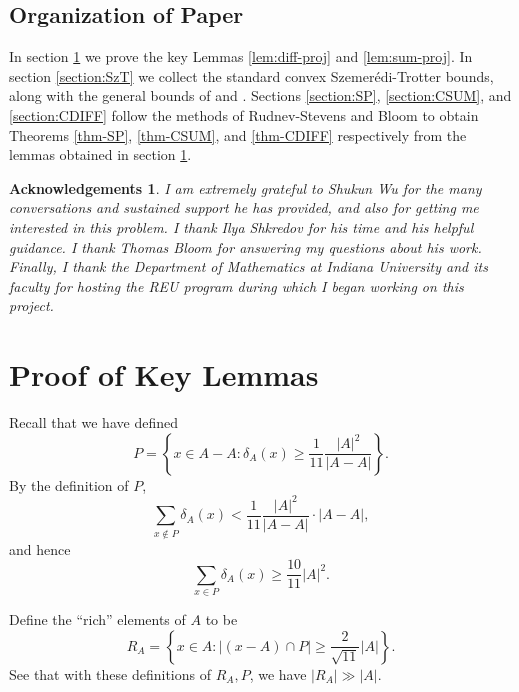 \documentclass[reqno]{amsart}
\newcommand{\szemeredi}{Szemer{\'e}di}
\numberwithin{equation}{section}
\newtheorem*{acknowledgement}{Acknowledgements}
\begin{document}
\medskip

\subsection*{Organization of Paper}
In section \ref{section:lemmas} we prove the key Lemmas \ref{lem:diff-proj} and \ref{lem:sum-proj}. In section 
\ref{section:SzT} we collect the standard convex \szemeredi-Trotter bounds, along
with the general bounds of \cite{rudnev-stevens} and \cite{bloom}. Sections \ref{section:SP}, \ref{section:CSUM}, and
\ref{section:CDIFF} follow the methods of Rudnev-Stevens and Bloom to obtain
Theorems \ref{thm-SP}, \ref{thm-CSUM}, and \ref{thm-CDIFF} respectively from the lemmas obtained in section \ref{section:lemmas}.

\begin{acknowledgement}
I am extremely grateful to Shukun Wu for the many conversations and sustained support he has provided,
and also for getting me interested in this problem. I thank Ilya Shkredov for his
time and his helpful guidance. I thank Thomas Bloom for answering my questions about his work.
Finally, I thank the Department of Mathematics at Indiana University and its faculty for hosting the REU program
during which I began working on this project.
\end{acknowledgement}

\bigskip

\section{Proof of Key Lemmas}\label{section:lemmas}
Recall that we have defined
\[
P =\left\{x \in A-A: \delta_A(x) \geq \frac{1}{11} \frac{|A|^2}{|A-A|}\right\}
.\]
By the definition of \(P\),
\[
    \sum _{x \not \in P} \delta_{A} (x) < \frac{1}{11} \frac{\left\lvert A \right\rvert ^{2}}{\left\lvert A-A \right\rvert } \cdot \left\lvert A-A \right\rvert 
,\]
and hence
\[
\sum_{x \in P } \delta_A(x) \geq \frac{10}{11}|A|^2
.\]

Define the ``rich'' elements of \(A\) to be
\[
R_{A}  =\left\{x \in A:|(x-A) \cap P | \geq \frac{2}{\sqrt{11}}|A|\right\}
.\]
See that with these definitions of \(R_{A} , P \), we have \(\left\lvert R_{A}  \right\rvert \gg \left\lvert A \right\rvert  \). 
\end{document}
